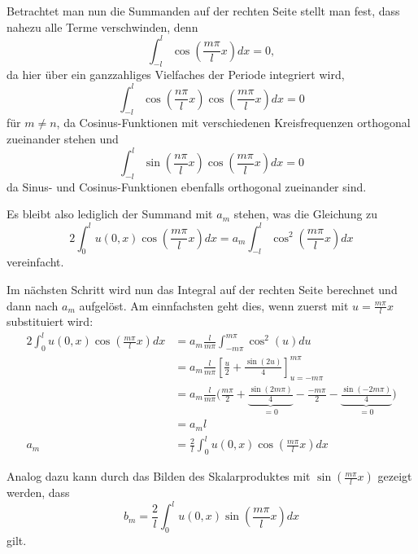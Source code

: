 Betrachtet man nun die Summanden auf der rechten Seite stellt man fest, dass
nahezu alle Terme verschwinden, denn
\[
    \int_{-l}^{l}\cos\left(\frac{m \pi}{l}x\right) dx
    =
    0,
\]
da hier über ein ganzzahliges Vielfaches der Periode integriert wird,
\[
    \int_{-l}^{l}\cos\left(\frac{n\pi}{l}x\right)
    \cos\left(\frac{m \pi}{l}x\right)dx
    =
    0
\]
für $m\neq n$, da Cosinus-Funktionen mit verschiedenen Kreisfrequenzen
orthogonal zueinander stehen und
\[
    \int_{-l}^{l}\sin\left(\frac{n\pi}{l}x\right)
        \cos\left(\frac{m \pi}{l}x\right)dx
    =
    0
\]
da Sinus- und Cosinus-Funktionen ebenfalls orthogonal zueinander sind.

Es bleibt also lediglich der Summand mit $a_m$ stehen, was die Gleichung zu
\[
    2\int_{0}^{l}u(0, x)\cos\left(\frac{m \pi}{l}x\right)dx
    =
    a_m\int_{-l}^{l}\cos^2\left(\frac{m\pi}{l}x\right)dx
\]
vereinfacht.

Im nächsten Schritt wird nun das Integral auf der rechten Seite
berechnet und dann nach $a_m$ aufgelöst. Am einnfachsten geht dies, wenn zuerst
mit $u = \frac{m \pi}{l}x$ substituiert wird:
\[
    \begin{aligned}
    2\int_{0}^{l}u(0, x)\cos\left(\frac{m \pi}{l}x\right)dx
    &=
    a_m\frac{l}{m\pi}\int_{-m\pi}^{m\pi}\cos^2\left(u\right)du
    \\
    &=
    a_m\frac{l}{m\pi}\left[\frac{u}{2} + 
    \frac{\sin\left(2u\right)}{4}\right]_{u=-m\pi}^{m\pi}
    \\
    &=
    a_m\frac{l}{m\pi}\biggl(\frac{m\pi}{2} + 
    \underbrace{\frac{\sin\left(2m\pi\right)}{4}}_{\displaystyle = 0} - 
    \frac{-m\pi}{2} -
    \underbrace{\frac{\sin\left(-2m\pi\right)}{4}}_{\displaystyle = 0}\biggr)
    \\
    &=
    a_m l
    \\
    a_m
    &=
    \frac{2}{l} \int_{0}^{l}u(0, x)\cos\left(\frac{m \pi}{l}x\right)dx
    \end{aligned}
\]

Analog dazu kann durch das Bilden des Skalarproduktes mit 
$ \sin\left(\frac{m \pi}{l}x\right) $ gezeigt werden, dass
\[
    b_m
    =
    \frac{2}{l} \int_{0}^{l}u(0, x)\sin\left(\frac{m \pi}{l}x\right)dx
\]
gilt.

